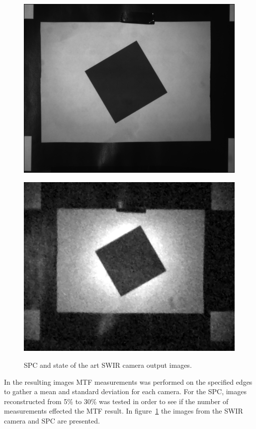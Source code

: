 \begin{figure}[H]
\begin{minipage}[t]{0.45\textwidth}
    \includegraphics[width=1\textwidth]{result/mtf/swir1.png}
    \subcaption{}
    \label{fig:mtf_s1}
\end{minipage}
\begin{minipage}[t]{0.45\textwidth}
    \includegraphics[width=1\textwidth]{result/mtf/spc12.png}
    \subcaption{}
    \label{fig:mtf_spc1}
\end{minipage}
    \caption{SPC and state of the art SWIR camera output images.}
    \label{fig:mtf_target_im}
\end{figure}

In the resulting images MTF measurements was performed on the specified edges to gather a mean and standard deviation for each camera. For the SPC, images reconstructed from 5\% to 30\% was tested in order to see if the number of measurements effected the MTF result. In figure~\ref{fig:mtf_target_im} the images from the SWIR camera and SPC are presented.




